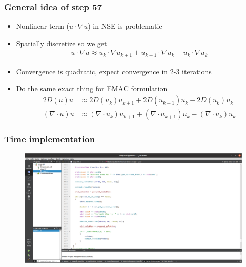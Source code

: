 \documentclass{beamer}
\newcommand{\divergence}{\nabla \cdot}
\begin{document}

\begin{frame}
\frametitle{General idea of step 57}
\begin{itemize}
\item Nonlinear term ($u \cdot \nabla u$) in NSE is problematic
\item Spatially discretize so we get
\begin{align*}
u \cdot \nabla u \approx u_k \cdot \nabla u_{k+1} + u_{k+1} \cdot \nabla u_k - u_k \cdot \nabla u_k
\end{align*}
\item Convergence is quadratic, expect convergence in 2-3 iterations
\item Do the same exact thing for EMAC formulation
\begin{align*}
2D(u)u &\approx 2D(u_k)u_{k+1} + 2D(u_{k+1})u_k - 2D(u_k)u_k\\
(\divergence u)u &\approx (\divergence u_k)u_{k+1} + (\divergence u_{k+1})u_k - (\divergence u_k)u_k
\end{align*}

\end{itemize}
\end{frame}


\begin{frame}
\frametitle{Time implementation}
\begin{figure}
\includegraphics[scale=.18]{time_code.png}
\end{figure}
\end{frame}

\end{document}
